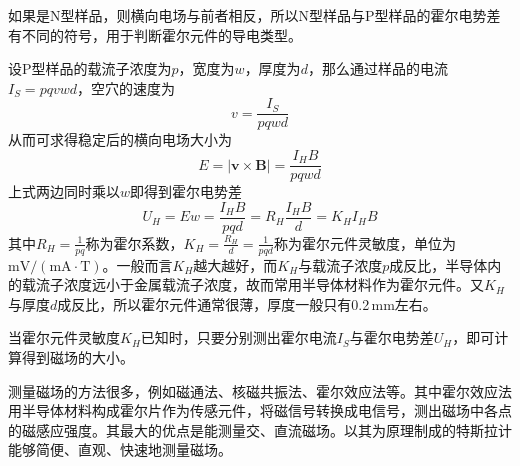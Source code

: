\documentclass[UTF8]{article}
\theoremstyle{MyLineTheoremStyle} %
\theoremstyle{MyBlockTheoremStyle} %
\theoremstyle{MySubsubsectionStyle} %
\begin{document}
如果是N型样品，则横向电场与前者相反，所以N型样品与P型样品的霍尔电势差有不同的符号，用于判断霍尔元件的导电类型。

设P型样品的载流子浓度为$ p $，宽度为$ w $，厚度为$ d $，那么通过样品的电流$ I_S=pqvwd $，空穴的速度为
\begin{equation}
v=\frac{I_S}{pqwd}
\end{equation}
从而可求得稳定后的横向电场大小为
\begin{equation}
E=| \boldsymbol{v}\times \boldsymbol{B}|=\frac{I_HB}{pqwd}
\end{equation}
上式两边同时乘以$ w $即得到霍尔电势差
\begin{equation}
U_H=Ew=\frac{I_HB}{pqd}=R_H\frac{I_HB}{d}=K_HI_HB
\end{equation}
其中$ R_H=\frac{1}{pq} $称为霍尔系数，$ K_H=\frac{R_H}{d}=\frac{1}{pqd} $称为霍尔元件灵敏度，单位为$ \mathrm{mV/(mA\cdot T)} $。一般而言$ K_H $越大越好，而$ K_H $与载流子浓度$ p $成反比，半导体内的载流子浓度远小于金属载流子浓度，故而常用半导体材料作为霍尔元件。又$ K_H $与厚度$ d $成反比，所以霍尔元件通常很薄，厚度一般只有0.2\,mm左右。

当霍尔元件灵敏度$ K_H $已知时，只要分别测出霍尔电流$ I_S $与霍尔电势差$ U_H $，即可计算得到磁场的大小。

测量磁场的方法很多，例如磁通法、核磁共振法、霍尔效应法等。其中霍尔效应法用半导体材料构成霍尔片作为传感元件，将磁信号转换成电信号，测出磁场中各点的磁感应强度。其最大的优点是能测量交、直流磁场。以其为原理制成的特斯拉计能够简便、直观、快速地测量磁场。
\end{document}
